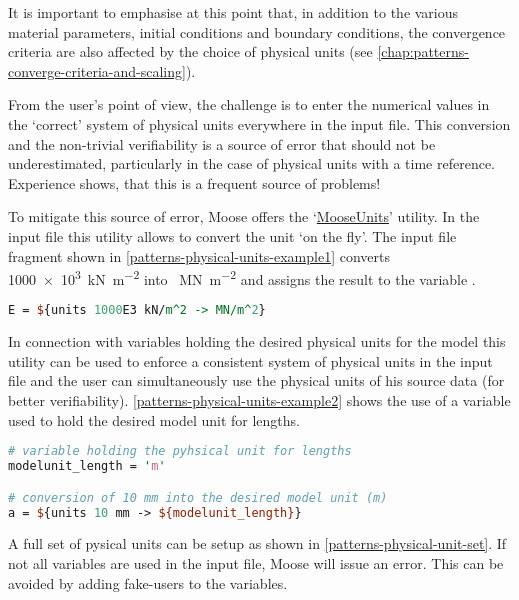 It is important to emphasise at this point that, in addition to the various
material parameters, initial conditions and boundary conditions, the
convergence criteria are also affected by the choice of physical units (see
\autoref{chap:patterns-converge-criteria-and-scaling}).

From the user's point of view, the challenge is to enter the numerical values
in the ‘correct’ system of physical units everywhere in the input file. This
conversion and the non-trivial verifiability is a source of error that should
not be underestimated, particularly in the case of physical units with a time
reference. Experience shows, that this is a frequent source of problems!

To mitigate this source of error, Moose offers the
‘\href{https://mooseframework.inl.gov/source/utils/Units.html}{MooseUnits}’
utility. In the input file this utility allows to convert the unit ‘on the
fly’. The input file fragment shown in
\autoref{patterns-physical-units-example1} converts \SI{1000e3}{\kN\per\m^2}
into \SI{}{\MN\per\m^2} and assigns the result to the variable .

\begin{lstlisting}[language=perl, caption={Converting \SI{1000e3}{\kN\per\m^2} into
    \SI{}{\MN\per\m^2}},label={patterns-physical-units-example1}]
E = ${units 1000E3 kN/m^2 -> MN/m^2}
\end{lstlisting}

In connection with variables holding the desired physical units for the model
this utility can be used to enforce a consistent system of physical units in
the input file and the user can simultaneously use the physical units of his
source data (for better verifiability).
\autoref{patterns-physical-units-example2} shows the use of a variable used to
hold the desired model unit for lengths.

\begin{lstlisting}[language=perl, caption={Using a variable to hold the physical unit for lengths},label={patterns-physical-units-example2}]
# variable holding the pyhsical unit for lengths
modelunit_length = 'm'

# conversion of 10 mm into the desired model unit (m)
a = ${units 10 mm -> ${modelunit_length}}
\end{lstlisting}

A full set of pysical units can be setup as shown in
\autoref{patterns-physical-unit-set}. If not all variables are used in the
input file, Moose will issue an error. This can be avoided by adding fake-users
to the variables.


